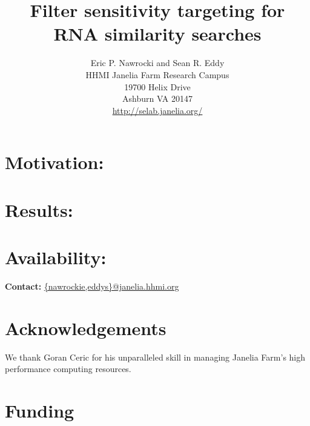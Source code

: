 \documentclass[11pt]{article}
\begin{document}
\title{Filter sensitivity targeting for RNA similarity searches}
\author{Eric P. Nawrocki and Sean R. Eddy\\
HHMI Janelia Farm Research Campus\\
19700 Helix Drive\\
Ashburn VA 20147\\
\url{http://selab.janelia.org/}\\
}
\maketitle

\section{Motivation:}

\section{Results:}

\section{Availability:}

\textbf{Contact:} \url{{nawrockie,eddys}@janelia.hhmi.org}







\section{Acknowledgements}
We thank Goran Ceric for his unparalleled skill in managing Janelia Farm's
high performance computing resources.

\section{Funding}





\newpage
\end{document}
